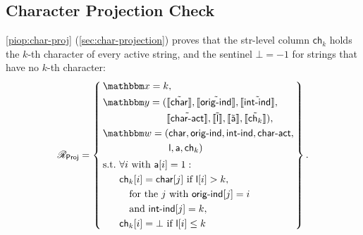 \fi
{}

\subsection{Character Projection Check}
\label{sec:proof-proj}
\cref{piop:char-proj} (\cref{sec:char-projection}) proves that the str-level column $\mathsf{ch}_k$ holds the $k$-th character of every active string, and the sentinel $\bot = -1$ for strings that have no $k$-th character:
\ifsp
\begin{displaymath}
\NPRelation_{\mathsf{Proj}} = \left\{\,
  \begin{aligned}
    & \NPInstance = k,\\
    & \NPInstancey = (\Oracle{\MLE{\mathsf{char}}}, \Oracle{\MLE{\mathsf{orig\text{-}ind}}}, \Oracle{\MLE{\mathsf{int\text{-}ind}}},\\
    & \phantom{\NPInstancey = (}\Oracle{\MLE{\mathsf{char\text{-}act}}}, \Oracle{\MLE{\mathsf{l}}}, \Oracle{\MLE{\mathsf{a}}}, \Oracle{\MLE{\mathsf{ch}_k}}),\\
    & \NPWitness = (\mathsf{char}, \mathsf{orig\text{-}ind}, \mathsf{int\text{-}ind}, \mathsf{char\text{-}act},\\
    & \phantom{\NPWitness = (}\mathsf{l}, \mathsf{a}, \mathsf{ch}_k)\\[2pt]
    & \text{s.t.}\ \forall i\ \text{with}\ \mathsf{a}[i] = 1:\\
    & \phantom{\text{s.t.}}\ \mathsf{ch}_k[i] = \mathsf{char}[j]\ \text{if } \mathsf{l}[i] > k,\\
    & \phantom{\text{s.t.}}\ \quad \text{for the } j \text{ with } \mathsf{orig\text{-}ind}[j] = i\\
    & \phantom{\text{s.t.}}\ \quad \text{and } \mathsf{int\text{-}ind}[j] = k,\\
    & \phantom{\text{s.t.}}\ \mathsf{ch}_k[i] = \bot\ \text{if } \mathsf{l}[i] \le k
  \end{aligned}
\,\right\}.
\end{displaymath}
\else
